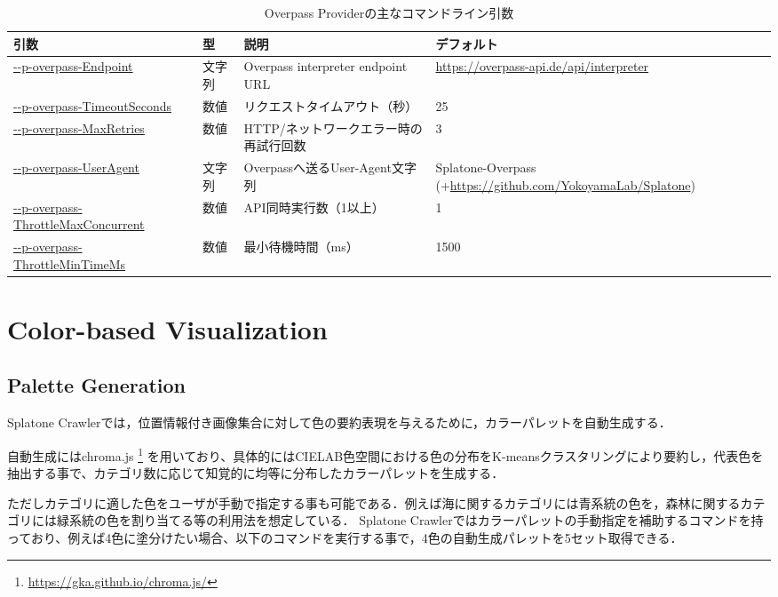 \documentclass[11pt,a4paper]{jlreq}
\begin{document}
\begin{table}[h]
\centering\small
\setlength{\tabcolsep}{3pt}
\caption{Overpass Providerの主なコマンドライン引数}
\label{tab:overpass_provider_params}
\begin{tabularx}{\textwidth}{L{0.40\textwidth} L{0.09\textwidth} Y L{0.16\textwidth}}
\hline
引数 & 型 & 説明 & デフォルト \\
\hline
\url{--p-overpass-Endpoint} & 文字列 & Overpass interpreter endpoint URL & \url{https://overpass-api.de/api/interpreter} \\
\url{--p-overpass-TimeoutSeconds} & 数値 & リクエストタイムアウト（秒） & 25 \\
\url{--p-overpass-MaxRetries} & 数値 & HTTP/ネットワークエラー時の再試行回数 & 3 \\
\url{--p-overpass-UserAgent} & 文字列 & Overpassへ送るUser-Agent文字列 & Splatone-Overpass (+\url{https://github.com/YokoyamaLab/Splatone}) \\
\url{--p-overpass-ThrottleMaxConcurrent} & 数値 & API同時実行数（1以上） & 1 \\
\url{--p-overpass-ThrottleMinTimeMs} & 数値 & 最小待機時間（ms） & 1500 \\
\hline
\end{tabularx}
\end{table}


\section{Color-based Visualization}
\label{sec:colorviz}
\subsection{Palette Generation}
Splatone Crawlerでは，位置情報付き画像集合に対して色の要約表現を与えるために，カラーパレットを自動生成する．

自動生成にはchroma.js \footnote{\url{https://gka.github.io/chroma.js/}} を用いており、具体的にはCIELAB色空間における色の分布をK-meansクラスタリングにより要約し，代表色を抽出する事で、カテゴリ数に応じて知覚的に均等に分布したカラーパレットを生成する．

ただしカテゴリに適した色をユーザが手動で指定する事も可能である．例えば海に関するカテゴリには青系統の色を，森林に関するカテゴリには緑系統の色を割り当てる等の利用法を想定している．
Splatone Crawlerではカラーパレットの手動指定を補助するコマンドを持っており、例えば4色に塗分けたい場合、以下のコマンドを実行する事で，4色の自動生成パレットを5セット取得できる．
\end{document}
